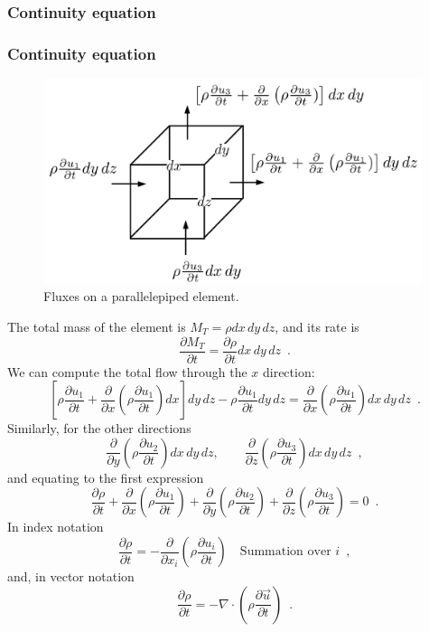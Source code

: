 \documentclass{beamer}
\newcommand{\pardiff}[2]{\frac{\partial #1}{\partial #2}}
\begin{document}
\subsubsection{Continuity equation}
\begin{frame}[allowframebreaks]\frametitle{Continuity equation}
\begin{figure}[h]
	\centering
	\includegraphics[height=6cm]{img/continuity.pdf}
	\caption{Fluxes on a parallelepiped element.}
\end{figure}
The total mass of the element is $M_T = \rho dx\, dy\, dz$, and its rate is
\[\pardiff{M_T}{t} = \pardiff{\rho}{t} dx\, dy\, dz \enspace .\]
We can compute the total flow through the $x$ direction:
\[\left[ \rho \pardiff{u_1}{t} + \pardiff{}{x}\left(\rho \pardiff{u_1}{t}\right) dx\right] dy\, dz - \rho \pardiff{u_1}{t} dy\, dz = \pardiff{}{x}\left(\rho \pardiff{u_1}{t}\right)dx\, dy\, dz \enspace .\]
Similarly, for the other directions
\[\pardiff{}{y}\left(\rho \pardiff{u_2}{t}\right)dx\, dy\, dz,\qquad \pardiff{}{z}\left(\rho \pardiff{u_3}{t}\right)dx\, dy\, dz \enspace ,\]
and equating to the first expression
\[\pardiff{\rho}{t} + \pardiff{}{x}\left(\rho \pardiff{u_1}{t}\right) + \pardiff{}{y}\left(\rho \pardiff{u_2}{t}\right) + \pardiff{}{z}\left(\rho \pardiff{u_3}{t}\right) = 0\enspace .\]
In index notation
\[\pardiff{\rho}{t} = - \pardiff{}{x_i}\left(\rho \pardiff{u_i}{t}\right) \quad \text{Summation over } i \enspace ,\]
and, in vector notation
\[\pardiff{\rho}{t} = - \nabla \cdot \left(\rho \pardiff{\vec{u}}{t}\right) \enspace.\]
\end{frame}

\end{document}
